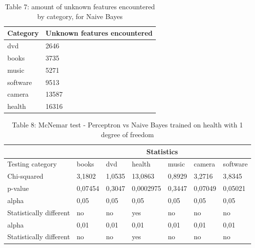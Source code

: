 \begin{table}[htdp]
\caption*{Table 7: amount of unknown features encountered by category, for Naive Bayes}
\begin{center}
\begin{tabular}{ | l | p{3cm} | }
\hline
Category & Unknown features encountered \\ \hline
dvd & 2646 \\
books & 3735 \\
music & 5271 \\
software & 9513 \\
camera & 13587 \\
health & 16316 \\ \hline

\end{tabular}
\end{center}
\label{default}
\end{table}



\begin{table}[htdp]
\caption*{Table 8: McNemar test - Perceptron vs Naive Bayes trained on health with 1 degree of freedom}
\begin{center}
\begin{tabular}{ | l | l | l | l | l | l | l |}

\hline
& \multicolumn{6}{|c|}{Statistics}\\
\hline
Testing category &books &dvd &health  &music &camera  &software \\
\hline
Chi-squared & 3,1802 & 1,0535 & 13,0863  & 0,8929 & 3,2716 & 3,8345 \\
p-value & 0,07454 & 0,3047  & 0,0002975 & 0,3447 & 0,07049  & 0,05021 \\
alpha  & 0,05 & 0,05 & 0,05  & 0,05 & 0,05  & 0,05 \\
Statistically different & no & no  & yes & no & no & no \\
alpha  & 0,01  & 0,01 & 0,01 & 0,01 & 0,01 & 0,01 \\
Statistically different  & no & no  & yes & no & no & no \\
\hline

\end{tabular}
\end{center}
\label{default}
\end{table}

